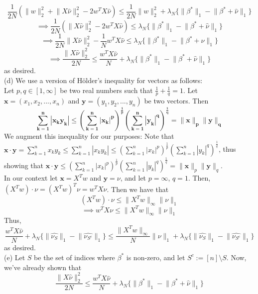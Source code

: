 \documentclass[a4paper,11pt]{article}
\numberwithin{definition}{section}
\numberwithin{mytheorem}{subsection}
\begin{document}
$$\frac{1}{2N}(\lVert w\rVert^2_2 + \lVert X\widehat{\nu}\rVert^2_2 - 2w^TX\widehat{\nu}) \leq \frac{1}{2N}\lVert w\rVert^2_2 + \lambda_N\{\lVert\beta^{*}\rVert_1 - \lVert\beta^* + \widehat{\nu}\rVert_1\}$$
$$\implies \frac{1}{2N}(\lVert X\widehat{\nu}\rVert^2_2 - 2w^TX\widehat{\nu}) \leq \lambda_N\{\lVert\beta^{*}\rVert_1 - \lVert\beta^* + \widehat{\nu}\rVert_1\}$$
$$\implies \frac{1}{2N}\lVert X\widehat{\nu}\rVert^2_2 - \frac{1}{N}w^TX\widehat{\nu}\leq \lambda_N\{\lVert\beta^{*}\rVert_1 - \lVert\beta^* + \widehat{\nu}\rVert_1\}$$
$$\implies \frac{\lVert X\widehat{\nu}\rVert^2_2}{2N} \leq \frac{w^TX\widehat{\nu}}{N} + \lambda_N\{\lVert\beta^{*}\rVert_1 - \lVert\beta^* + \widehat{\nu}\rVert_1\}$$
as desired.\\
(d) We use a version of H\"{o}lder's inequality for vectors as follows:\\
Let $p, q\in[1,\infty]$ be two real numbers such that $\frac{1}{p} + \frac{1}{q} = 1$. Let $\boldsymbol{x} = (x_1, x_2, ..., x_n)$ and $\boldsymbol{y} = (y_1, y_2, ..., y_n)$ be two vectors. Then
$$\boldsymbol{\sum^{n}_{k = 1}|x_ky_k|\leq (\sum^{n}_{k = 1}|x_k|^p)^{\frac{1}{p}}(\sum^{n}_{k = 1}|y_k|^q)^{\frac{1}{q}} = \lVert x\rVert_p\lVert y\rVert_q}$$
We augment this inequality for our purposes: Note that $\boldsymbol{x}\cdot\boldsymbol{y} = \sum^{n}_{k = 1}x_ky_k \leq \sum^{n}_{k = 1}|x_ky_k| \leq (\sum^{n}_{k = 1}|x_k|^p)^{\frac{1}{p}}(\sum^{n}_{k = 1}|y_k|^q)^{\frac{1}{q}}$, thus showing that $\boldsymbol{x}\cdot\boldsymbol{y}\leq (\sum^{n}_{k = 1}|x_k|^p)^{\frac{1}{p}}(\sum^{n}_{k = 1}|y_k|^q)^{\frac{1}{q}} = \lVert \boldsymbol{x}\rVert_p\lVert \boldsymbol{y}\rVert_q$.\\
In our context let $\boldsymbol{x} = X^Tw$ and $\boldsymbol{y} = \nu$, and let $p =\infty$, $q = 1$. Then, $(X^Tw)\cdot\nu = (X^Tw)^T\nu = w^TX\nu$. Then we have that 
$$(X^Tw)\cdot\nu\leq \lVert X^Tw\rVert_{\infty}\lVert \nu\rVert_1$$
$$\implies w^TX\nu\leq \lVert X^Tw\rVert_{\infty}\lVert \nu\rVert_1$$
Thus, 
$$\frac{w^TX\widehat{\nu}}{N} + \lambda_N\{\lVert\widehat{\nu_S}\rVert_1 - \lVert\widehat{\nu_{S^c}}\rVert_1\}\leq \frac{\lVert X^Tw\rVert_{\infty}}{N}\lVert \nu\rVert_1 + \lambda_N\{\lVert\widehat{\nu_S}\rVert_1 - \lVert\widehat{\nu_{S^c}}\rVert_1\}$$
as desired.\\
(e) Let $S$ be the set of indices where $\beta^*$ is non-zero, and let $S^c := [n]\setminus S$. Now, we've already shown that
$$\frac{\lVert X\widehat{\nu}\rVert^2_2}{2N} \leq \frac{w^TX\widehat{\nu}}{N} + \lambda_N\{\lVert\beta^{*}\rVert_1 - \lVert\beta^* + \widehat{\nu}\rVert_1\}$$
\end{document}
